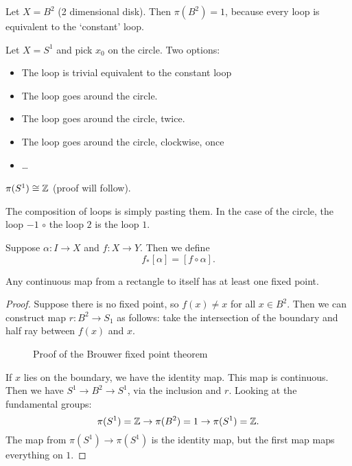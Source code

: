 \begin{eg}
    Let $X = B^2$ (2 dimensional disk).
    Then $\pi(B^2) = 1$, because every loop is equivalent to the `constant' loop.
\end{eg}
\begin{eg}
    Let $X = S^{1}$ and pick $x_0$ on the circle.
    Two options: 
    \begin{itemize}
        \item The loop is trivial equivalent to the constant loop
        \item The loop goes around the circle.
        \item The loop goes around the circle, twice.
        \item The loop goes around the circle, clockwise, once
        \item \ldots
    \end{itemize}
    $\pi(S^{1}) \cong \mathbb{Z}$ (proof will follow).
\end{eg}

The composition of loops is simply pasting them.
In the case of the circle, the loop $-1$  $\circ$ the loop  $2$ is the loop $1$.

Suppose $\alpha: I \to  X$ and $f : X\to Y$. Then we define 
\[
    f_*[\alpha] = [f \circ \alpha]
.\] 


\begin{theorem}
    Any continuous map from a rectangle to itself has at least one fixed point.
\end{theorem}
\begin{proof}
    Suppose there is no fixed point, so $f(x) \neq x$ for all  $x \in B^2$.
    Then we can construct map $r : B^2 \to  S_1$ as follows:
    take the intersection of the boundary and half ray between $f(x)$ and $x$.
    \begin{figure}[H]
        \centering
        \caption{Proof of the Brouwer fixed point theorem}
        \label{fig:proof-fixed-point-brouwer}
    \end{figure}
    If $x$ lies on the boundary, we have the identity map.
    This map is continuous.
    Then we have $S^1 \to B^2 \to S^1$, via the inclusion and $r$.
    Looking at the fundamental groups:
    \[
        \pi(S^1)  =\mathbb{Z} \to  \pi(B^2) = 1 \to  \pi(S^1) = \mathbb{Z}
    .\] 
    The map from $\pi(S^1) \to  \pi(S^{1})$ is the identity map, but the first map maps everything on $1$. \phantom\qedhere\hfill\contra 
\end{proof}



